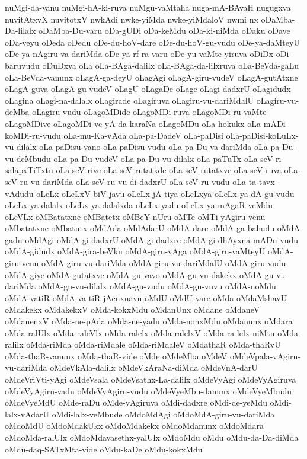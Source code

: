 {nuMgi-da-vanu
nuMgi-hA-ki-ruva
nuMgu-vaMtaha
nuga-mA-BAvaH
nugugxva
nuvitAtxvX
nuvitotxV
nwkAdi
nwke-yiMda
nwke-yiMdaloV
nwmi
nx
oDaMba-Da-lilalx
oDaMba-Du-varu
oDa-gUDi
oDa-keMdu
oDa-ki-niMda
oDaku
oDave
oDa-veyu
oDeda
oDedu
oDe-du-hoV-dare
oDe-du-hoV-gu-vudu
oDe-ya-daMteyU
oDe-ya-nAgiru-va-dariMda
oDe-ya-rf-ra-varu
oDe-yu-vaMte-yiruva
oDiDx
oDi-baruvudu
oDuDxva
oLa
oLa-BAga-dalilx
oLa-BAga-da-lilxruva
oLa-BeVda-gaLu
oLa-BeVda-vanunx
oLagA-ga-deyU
oLagAgi
oLagA-giru-vudeV
oLagA-gutAtxne
oLagA-guva
oLagA-gu-vudeV
oLagU
oLagaDe
oLage
oLagi-dadxrU
oLagidudx
oLagina
oLagi-na-dalalx
oLagirade
oLagiruva
oLagiru-vu-dariMdalU
oLagiru-vu-deMba
oLagiru-vudu
oLagoMDide
oLagoMDi-ruva
oLagoMDi-ru-vaMte
oLagoMDive
oLagoMDi-ve-yA-da-karaNa
oLagoMDu
oLa-hokukx
oLa-mADi-koMDi-ru-vudu
oLa-mu-Ka-vAda
oLa-pa-DadeV
oLa-paDisi
oLa-paDisi-koLuLx-vu-dilalx
oLa-paDisu-vano
oLa-paDisu-vudu
oLa-pa-Du-va-dariMda
oLa-pa-Du-vu-deMbudu
oLa-pa-Du-vudeV
oLa-pa-Du-vu-dilalx
oLa-paTuTx
oLa-seV-ri-salapxTiTxtu
oLa-seV-rive
oLa-seV-rutatxde
oLa-seV-rutatxve
oLa-seV-ruva
oLa-seV-ru-vu-dariMda
oLa-seV-ru-vu-di-dadxrU
oLa-seV-ru-vudu
oLa-ta-tavx-vAdudu
oLeLx
oLeLxV-biV-javu
oLeLx-jA-tiya
oLeLxya
oLeLx-ya-dA-gu-vudu
oLeLx-ya-dalalx
oLeLx-ya-dalalxda
oLeLx-yadu
oLeLx-ya-mAgaR-veMdu
oLeVLx
oMBatatxne
oMBatetx
oMBeY-nUru
oMTe
oMTi-yAgiru-venu
oMbatatxne
oMbatutx
oMdAda
oMdAdarU
oMdA-dare
oMdA-ga-bahudu
oMdA-gadu
oMdAgi
oMdA-gi-dadxrU
oMdA-gi-dadxre
oMdA-gi-dhAyxna-mADu-vudu
oMdA-gidudx
oMdA-gira-beVku
oMdA-giru-vAga
oMdA-giru-vaMteyU
oMdA-giru-venu
oMdA-giru-vu-dariMda
oMdA-giru-vu-dariMdalU
oMdA-giru-vudu
oMdA-giye
oMdA-gutatxve
oMdA-gu-vavo
oMdA-gu-vu-dakekx
oMdA-gu-vu-dariMda
oMdA-gu-vu-dilalx
oMdA-gu-vudu
oMdA-gu-vuvu
oMdA-noMdu
oMdA-vatiR
oMdA-va-tiR-jAcnxnavu
oMdU
oMdU-vare
oMda
oMdaMshavU
oMdakekx
oMdakekxV
oMda-kokxMdu
oMdanUnx
oMdane
oMdaneV
oMdanenxV
oMda-ne-pAda
oMda-ne-yadu
oMda-nonxMdu
oMdanunx
oMdara
oMda-ralUlx
oMda-raleVlx
oMda-ralelx
oMda-ralelxV
oMda-ra-lelx-niMtu
oMda-ralilx
oMda-riMda
oMda-riMdale
oMda-riMdaleV
oMdathaR
oMda-thaRvU
oMda-thaR-vanunx
oMda-thaR-vide
oMde
oMdeMba
oMdeV
oMdeVpala-vAgiru-vu-dariMda
oMdeVkAla-dalilx
oMdeVkAraNa-diMda
oMdeVnA-darU
oMdeVriVti-yAgi
oMdeVsala
oMdeVsathx-La-dalilx
oMdeVyAgi
oMdeVyAgiruva
oMdeVyAgiru-vadu
oMdeVyAgiru-vudu
oMdeVyeMbu-danunx
oMdeVyeMbudu
oMdeVyeMdU
oMde-raDu
oMde-yAgiruva
oMdi-dadxre
oMdi-de-yeMdu
oMdi-lalx-vAdarU
oMdi-lalx-veMbude
oMdoMdAgi
oMdoMdA-giru-vu-dariMda
oMdoMdU
oMdoMdakUkx
oMdoMdakekx
oMdoMdanunx
oMdoMdara
oMdoMda-ralUlx
oMdoMdavasethx-yalUlx
oMdoMdu
oMdu
oMdu-da-Da-diMda
oMdu-daq-SATxMta-vide
oMdu-kaDe
oMdu-kokxMdu
}
